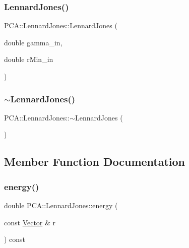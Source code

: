 \subsubsection{\texorpdfstring{Lennard\+Jones()}{LennardJones()}}
{\footnotesize\ttfamily P\+C\+A\+::\+Lennard\+Jones\+::\+Lennard\+Jones (\begin{DoxyParamCaption}\item[{double}]{gamma\+\_\+in,  }\item[{double}]{r\+Min\+\_\+in }\end{DoxyParamCaption})}

\hypertarget{class_p_c_a_1_1_lennard_jones_ac8acfe0ebd2e7f263d6561ab515f0028}{}\label{class_p_c_a_1_1_lennard_jones_ac8acfe0ebd2e7f263d6561ab515f0028} 
\subsubsection{\texorpdfstring{$\sim$\+Lennard\+Jones()}{~LennardJones()}}
{\footnotesize\ttfamily P\+C\+A\+::\+Lennard\+Jones\+::$\sim$\+Lennard\+Jones (\begin{DoxyParamCaption}{ }\end{DoxyParamCaption})}



\subsection{Member Function Documentation}
\hypertarget{class_p_c_a_1_1_lennard_jones_a310360e70f05d8ca7a809823e9c01422}{}\label{class_p_c_a_1_1_lennard_jones_a310360e70f05d8ca7a809823e9c01422} 
\subsubsection{\texorpdfstring{energy()}{energy()}}
{\footnotesize\ttfamily double P\+C\+A\+::\+Lennard\+Jones\+::energy (\begin{DoxyParamCaption}\item[{const \hyperlink{class_p_c_a_1_1_vector}{Vector} \&}]{r }\end{DoxyParamCaption}) const}



